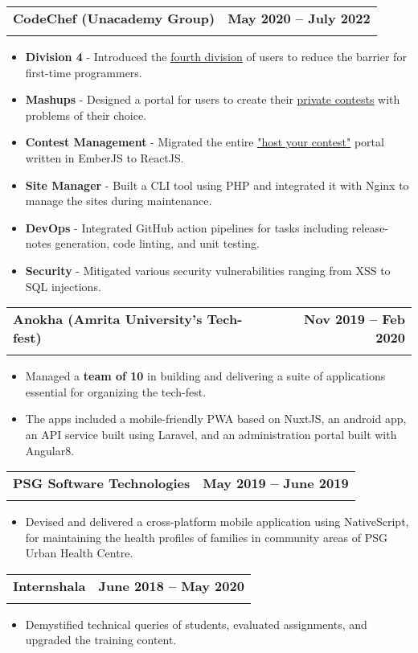 \documentclass[letterpaper,11pt]{article}
\makeatletter
\newcommand{\resumeItem}[1]{
  \item\small{
    {#1 \vspace{-2pt}}
  }
}
\newcommand{\resumeSubheading}[4]{
  \vspace{-2pt}\item
    \begin{tabular*}{1.0\textwidth}[t]{l@{\extracolsep{\fill}}r}
      \textbf{#1} & \textbf{\small #2} \\
      \text{\small#3} & \text{\small #4} \\
    \end{tabular*}\vspace{-7pt}
}
\newcommand{\resumeItemListStart}{\begin{itemize}}
\newcommand{\resumeItemListEnd}{\end{itemize}\vspace{-5pt}}
\makeatother
\begin{document}
    \resumeSubheading
      {CodeChef (Unacademy Group)}{May 2020 -- July 2022}
      {Application Engineer $|$ Prev. Intern $|$ Tech : PHP,  ReactJS,  MySQL, SaltStack, AWS}{Bangalore, India}
      \resumeItemListStart
        \resumeItem{\textbf{Division 4} - Introduced the \href{https://blog.codechef.com/2022/02/11/rated-contests-for-coders-with-no-dsa-knowledge-smells-like-div-4/}{\underline{fourth division}} of users to reduce the barrier for first-time programmers.}
        \resumeItem{\textbf{Mashups} - Designed a portal for users to create their \href{https://www.codechef.com/mashup-contest}{\underline{private contests}} with problems of their choice.}        
        \resumeItem{\textbf{Contest Management} - Migrated the entire \href{https://www.codechef.com/hostyourcontest/}{\underline{"host your contest"}} portal written in EmberJS to ReactJS.}
              \resumeItem{\textbf{Site Manager} - Built a CLI tool using PHP and integrated it with Nginx to manage the sites during maintenance.}
              \resumeItem{\textbf{DevOps} - Integrated GitHub action pipelines for tasks including release-notes generation, code linting, and unit testing.}
              \resumeItem{\textbf{Security} - Mitigated various security vulnerabilities ranging from XSS to SQL injections.}
      \resumeItemListEnd
    
    \resumeSubheading
      {Anokha (Amrita University's Tech-fest)}{Nov 2019 -- Feb 2020}
      {Head of the Software Team $|$ Tech: Laravel,  MySQL,  NuxtJS,  Angular8,  CentOS}{Coimbatore, India}
      \resumeItemListStart
        \resumeItem{Managed a \textbf{team of 10} in building and delivering a suite of applications essential for organizing the tech-fest.}
        \resumeItem{The apps included a mobile-friendly PWA based on NuxtJS,  an android app,  an API service built using Laravel,  and an administration portal built with Angular8.}
    \resumeItemListEnd    
    
    \resumeSubheading
      {PSG Software Technologies}{May 2019 -- June 2019}
      {Mobile App Developer Intern $|$ Tech : NodeJS,  NativeScript}{Coimbatore, India}
      \resumeItemListStart
        \resumeItem{Devised and delivered a cross-platform mobile application using NativeScript,  for maintaining the health profiles of families in community areas of PSG Urban Health Centre.}
    \resumeItemListEnd

    \resumeSubheading
      {Internshala}{June 2018 -- May 2020}
      {Teaching Assistant $|$ Tech: C/C++}{Remote}
      \resumeItemListStart
        \resumeItem{Demystified technical queries of students,  evaluated assignments, and upgraded the training content.}
    \resumeItemListEnd
    
\end{document}
